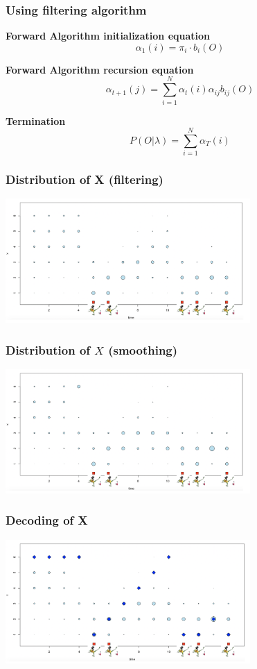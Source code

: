 \documentclass[xcolor=dvipsnames, compress]{beamer}
\begin{document}
\begin{frame}
\frametitle{Using filtering algorithm}
\textbf{Forward Algorithm initialization equation}
$$ \alpha_{1}(i) = \pi_i \cdot b_{i}(O) $$
	
\textbf{Forward Algorithm recursion equation}
$$ \alpha_{t+1}(j) = \sum_{i=1}^N \alpha_t(i) \alpha_{ij} b_{ij}(O) $$
	
\textbf{Termination}
$$ P(O|\lambda) = \sum_{i=1}^N \alpha_T(i)$$
\end{frame}

\begin{frame}
\frametitle{Distribution of X (filtering)}
	\begin{center}
	\includegraphics[width=0.7\textwidth]{images/ex_filtering_marco.png}
\end{center}
\end{frame}

\begin{frame}
\frametitle{Distribution of $X$ (smoothing)}
	\begin{center}
	\includegraphics[width=0.7\textwidth]{images/ex_smoothing_marco.png}
\end{center}
\end{frame}

\begin{frame}
\frametitle{Decoding of X}
\begin{center}
	\includegraphics[width=0.7\textwidth]{images/ex_decoding_marco.png}
\end{center}
\end{frame}
\end{document}

